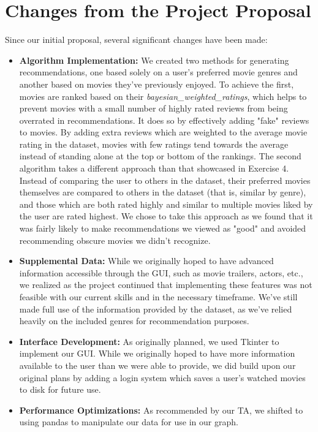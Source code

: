 \documentclass[12pt]{article}
\begin{document}
\section{Changes from the Project Proposal}
Since our initial proposal, several significant changes have been made:
\begin{itemize}
    \item \textbf{Algorithm Implementation:} We created two methods for generating recommendations, one based solely on a user's preferred movie genres and another based on movies they've previously enjoyed. To achieve the first, movies are ranked based on their \textit{bayesian\_weighted\_ratings}, which helps to prevent movies with a small number of highly rated reviews from being overrated in recommendations. It does so by effectively adding "fake" reviews to movies. By adding extra reviews which are weighted to the average movie rating in the dataset, movies with few ratings tend towards the average instead of standing alone at the top or bottom of the rankings. The second algorithm takes a different approach than that showcased in Exercise 4. Instead of comparing the user to others in the dataset, their preferred movies themselves are compared to others in the dataset (that is, similar by genre), and those which are both rated highly and similar to multiple movies liked by the user are rated highest. We chose to take this approach as we found that it was fairly likely to make recommendations we viewed as "good" and avoided recommending obscure movies we didn't recognize.
    \item \textbf{Supplemental Data:} While we originally hoped to have advanced information accessible through the GUI, such as movie trailers, actors, etc., we realized as the project continued that implementing these features was not feasible with our current skills and in the necessary timeframe. We've still made full use of the information provided by the dataset, as we've relied heavily on the included genres for recommendation purposes.
    \item \textbf{Interface Development:} As originally planned, we used Tkinter to implement our GUI. While we originally hoped to have more information available to the user than we were able to provide, we did build upon our original plans by adding a login system which saves a user's watched movies to disk for future use.
    \item \textbf{Performance Optimizations:} As recommended by our TA, we shifted to using pandas to manipulate our data for use in our graph.
\end{itemize}
\end{document}
